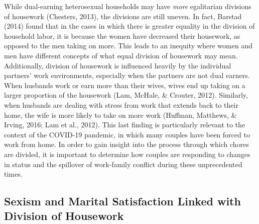 \documentclass[
  man]{apa6}
\begin{document}
While dual-earning heterosexual households may have \emph{more} egalitarian divisions of housework (Chesters, 2013), the divisions are still uneven. In fact, Barstad (2014) found that in the cases in which there is greater equality in the division of household labor, it is because the women have decreased their housework, as opposed to the men taking on more. This leads to an inequity where women and men have different concepts of what equal division of housework may mean. Additionally, division of housework is influenced heavily by the individual partners' work environments, especially when the partners are not dual earners. When husbands work or earn more than their wives, wives end up taking on a larger proportion of the housework (Lam, McHale, \& Crouter, 2012). Similarly, when husbands are dealing with stress from work that extends back to their home, the wife is more likely to take on more work (Huffman, Matthews, \& Irving, 2016; Lam et al., 2012). This last finding is particularly relevant to the context of the COVID-19 pandemic, in which many couples have been forced to work from home. In order to gain insight into the process through which chores are divided, it is important to determine how couples are responding to changes in status and the spillover of work-family conflict during these unprecedented times.

\hypertarget{sexism-and-marital-satisfaction-linked-with-division-of-housework}{%
\subsection{Sexism and Marital Satisfaction Linked with Division of Housework}\label{sexism-and-marital-satisfaction-linked-with-division-of-housework}}
\end{document}
